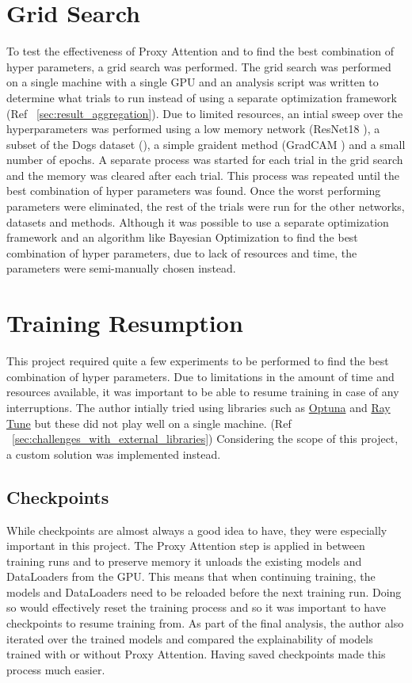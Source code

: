 \section{Grid Search}
To test the effectiveness of Proxy Attention and to find the best combination of hyper parameters, a grid search was performed. The grid search was performed on a single machine with a single GPU and an analysis script was written to determine what trials to run instead of using a separate optimization framework (Ref ~\ref{sec:result_aggregation}). 
Due to limited resources, an intial sweep over the hyperparameters was performed using a low memory network (ResNet18 \cite{heDeepResidualLearning2016}), a subset of the Dogs dataset (\cite{khoslaNovelDatasetFineGrained}), a simple graident method (GradCAM \cite{selvarajuGradCAMVisualExplanations}) and a small number of epochs. A separate process was started for each trial in the grid search and the memory was cleared after each trial. This process was repeated until the best combination of hyper parameters was found. Once the worst performing parameters were eliminated, the rest of the trials were run for the other networks, datasets and methods.
Although it was possible to use a separate optimization framework and an algorithm like Bayesian Optimization to find the best combination of hyper parameters, due to lack of resources and time, the parameters were semi-manually chosen instead.


\section{Training Resumption}
This project required quite a few experiments to be performed to find the best combination of hyper parameters. Due to limitations in the amount of time and resources available, it was important to be able to resume training in case of any interruptions. The author intially tried using libraries such as \href{https://github.com/optuna/optuna}{Optuna} and \href{https://github.com/ray-project/ray}{Ray Tune} but these did not play well on a single machine. (Ref ~\ref{sec:challenges_with_external_libraries}) Considering the scope of this project, a custom solution was implemented instead.

\subsection{Checkpoints} \label{sec:checkpoints}
While checkpoints are almost always a good idea to have, they were especially important in this project. The Proxy Attention step is applied in between training runs and to preserve memory it unloads the existing models and DataLoaders from the GPU. This means that when continuing training, the models and DataLoaders need to be reloaded before the next training run. Doing so would effectively reset the training process and so it was important to have checkpoints to resume training from.
As part of the final analysis, the author also iterated over the trained models and compared the explainability of models trained with or without Proxy Attention. Having saved checkpoints made this process much easier.

